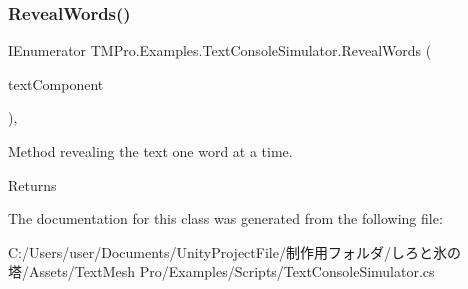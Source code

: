 \subsubsection{\texorpdfstring{Reveal\+Words()}{RevealWords()}}
{\footnotesize\ttfamily I\+Enumerator T\+M\+Pro.\+Examples.\+Text\+Console\+Simulator.\+Reveal\+Words (\begin{DoxyParamCaption}\item[{T\+M\+P\+\_\+\+Text}]{text\+Component }\end{DoxyParamCaption})\hspace{0.3cm}{\ttfamily [inline]}, {\ttfamily [private]}}



Method revealing the text one word at a time. 

\begin{DoxyReturn}{Returns}

\end{DoxyReturn}


The documentation for this class was generated from the following file\+:\begin{DoxyCompactItemize}
\item 
C\+:/\+Users/user/\+Documents/\+Unity\+Project\+File/制作用フォルダ/しろと氷の塔/\+Assets/\+Text\+Mesh Pro/\+Examples/\+Scripts/Text\+Console\+Simulator.\+cs\end{DoxyCompactItemize}
